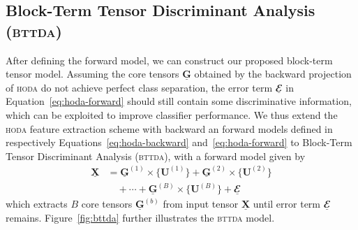 \documentclass[twocolumn]{article}
\newcommand{\ten}[1]{\underline{\mathbf{#1}}} %
\newcommand{\mat}[1]{\mathbf{#1}} %
\newcommand{\mmpr}[1]{\times\{#1\}} %
\begin{document}
\subsection{Block-Term Tensor Discriminant Analysis (\textsc{bttda})}
After defining the forward model, we can construct our proposed block-term
tensor model. Assuming the core tensors $\ten{G}$
obtained by the backward projection of \textsc{hoda} do not achieve perfect
class separation, the error term $\ten{\mathbfcal{E}}$ in
Equation~\ref{eq:hoda-forward} should still contain some discriminative
information, which can be exploited to improve classifier performance.
We thus extend the \textsc{hoda} feature extraction scheme with backward an
forward models defined in respectively Equations~\ref{eq:hoda-backward}
and~\ref{eq:hoda-forward} to Block-Term Tensor Discriminant Analysis
(\textsc{bttda}), with
a forward model given by
\begin{align}
  \ten{X} & = \ten{G}^{(1)}\mmpr{\mat{U}^{(1)}} +
  \ten{G}^{(2)}\mmpr{\mat{U}^{(2)}} \\
          &\quad + \cdots + \ten{G}^{(B)}\mmpr{\mat{U}^{(B)}} + \ten{\mathbfcal{E}}
  \label{eq:bttda-forward}
\end{align}
which extracts $B$ core tensors $\ten{G}^{(b)}$ from input tensor $\ten{X}$
until error term $\ten{\mathbfcal{E}}$ remains.
Figure~\ref{fig:bttda} further illustrates the \textsc{bttda} model.
\begin{figure*}
	\centering
	
  \caption{A forward model for Block-Term Tensor Discriminant Analysis
  (\textsc{bttda}). \textsc{bttda} can extract more features
 than \textsc{hoda} by iteratively finding a core tensor $\ten{G}^{(b)}$ in a
 deflation scheme.
 The \textsc{hoda} backward model is first applied. Next, the reconstructed
 input data is reconstructed via the \textsc{hoda} forward model and the
 difference between the two is found.
 Finally, this process is repeated with this difference as input data, until a
 desired number of blocks $B$ has been found.}
  \label{fig:bttda}
\end{figure*}
\end{document}
